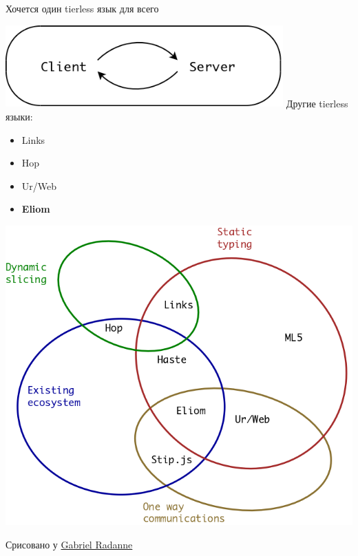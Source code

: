 \documentclass{beamer}
\theoremstyle{definition}
\begin{document}
\begin{frame}{Хочется один tierless язык для всего}
\begin{center}

\includegraphics[width=0.8\textwidth]{ClientServer.png}
\vskip5mm
Другие tierless языки:\\
\vskip5mm
\begin{minipage}{0.34\textwidth}
\begin{itemize}
 \item Links
 \item Hop
 \item Ur/Web
 \item \textbf{Eliom}
\end{itemize}
\end{minipage}

\end{center}
\end{frame}

\begin{frame}[fragile]{}
\includegraphics[width=.9\textwidth]{tierless.png}

Срисовано у \href{https://www.irif.fr/~gradanne/papers/talk_phdthesis.pdf#page=20}{Gabriel Radanne}
\end{frame}
\end{document}
